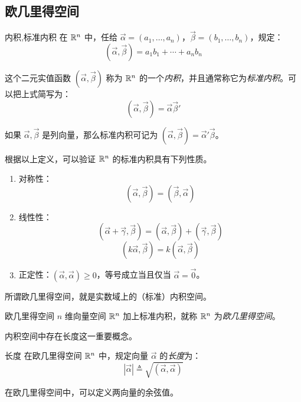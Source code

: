 \subsection{欧几里得空间}

\begin{definition}{内积,标准内积}
	在 $\mathbb R^n$ 中，任给 $\vec \alpha = (a_1, \ldots, a_n)$，$\vec \beta = (b_1, \ldots, b_n)$，规定：
	$$
	(\vec \alpha, \vec \beta) = a_1 b_1 + \cdots + a_n b_n
	$$

	这个二元实值函数 $(\vec \alpha, \vec \beta)$ 称为 $\mathbb R^n$ 的一个\emph{内积}，并且通常称它为\emph{标准内积}。可以把上式简写为：
	$$
	(\vec \alpha, \vec \beta) = \vec \alpha \vec \beta'
	$$

	如果 $\vec \alpha, \vec \beta$ 是列向量，那么标准内积可记为 $(\vec \alpha, \vec \beta) = \vec \alpha' \vec \beta$。
\end{definition}

根据以上定义，可以验证 $\mathbb R^n$ 的标准内积具有下列性质。

\begin{theorem}[标准内积的性质]
	\begin{enumerate}
		\item 对称性：
		$$
		(\vec \alpha, \vec \beta) = (\vec \beta, \vec \alpha)
		$$
		\item 线性性：
		$$
		(\vec \alpha + \vec \gamma, \vec \beta) = (\vec \alpha, \vec \beta) + (\vec \gamma, \vec \beta)
		$$$$
		(k \vec \alpha, \vec \beta) = k(\vec \alpha, \vec \beta)
		$$
		\item 正定性：$(\vec \alpha, \vec \alpha) \ge 0$，等号成立当且仅当 $\vec \alpha = \vec 0$。
	\end{enumerate}
\end{theorem}

所谓欧几里得空间，就是实数域上的（标准）内积空间。

\begin{definition}{欧几里得空间}
	$n$ 维向量空间 $\mathbb R^n$ 加上标准内积，就称 $\mathbb R^n$ 为\emph{欧几里得空间}。
\end{definition}

内积空间中存在长度这一重要概念。

\begin{definition}{长度}
	在欧几里得空间 $\mathbb R^n$ 中，规定向量 $\vec \alpha$ 的\emph{长度}为：
	$$
	|\vec \alpha| \triangleq \sqrt{(\vec \alpha, \vec \alpha)}
	$$
\end{definition}

在欧几里得空间中，可以定义两向量的余弦值。

